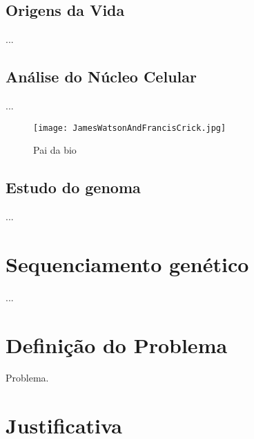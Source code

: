 

\subsection{Origens da Vida}

\indent ...

\subsection{Análise do Núcleo Celular}

\indent ...

\vspace{1cm}
 \begin{figure}[h!]
     \centering
     \texttt{[image: JamesWatsonAndFrancisCrick.jpg]}
     \caption{Pai da bio}
     \label{fig:JamesWatsonAndFrancisCrick}
 \end{figure}
\vspace{1cm}

\subsection{Estudo do genoma}

\indent ... 




\section{Sequenciamento genético}

\indent ...


\section{Definição do Problema}

\indent Problema.



\section{Justificativa}

